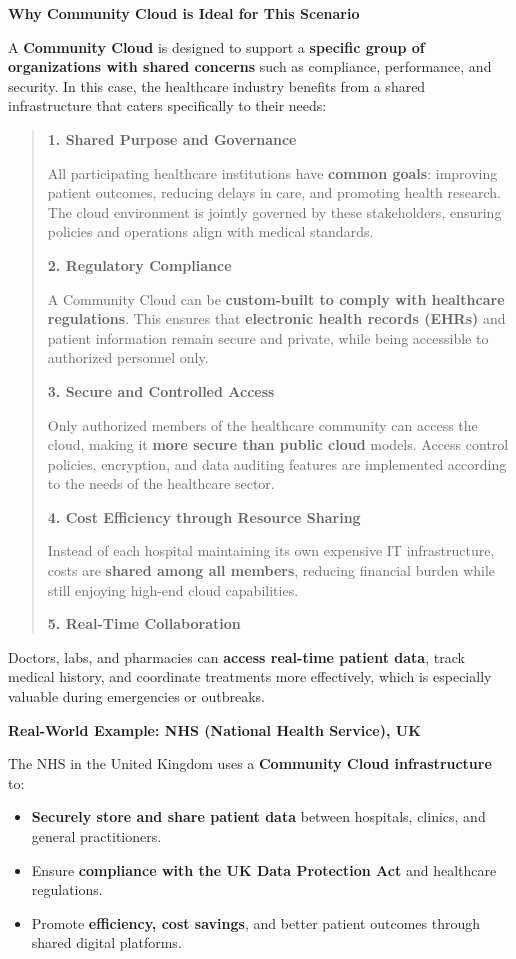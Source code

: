 \documentclass[12pt]{article}
\begin{document}
\textbf{Why Community Cloud is Ideal for This Scenario}

A \textbf{Community Cloud} is designed to support a \textbf{specific
group of organizations with shared concerns} such as compliance,
performance, and security. In this case, the healthcare industry
benefits from a shared infrastructure that caters specifically to their
needs:

\begin{quote}
\textbf{1. Shared Purpose and Governance}

All participating healthcare institutions have \textbf{common goals}:
improving patient outcomes, reducing delays in care, and promoting
health research. The cloud environment is jointly governed by these
stakeholders, ensuring policies and operations align with medical
standards.

\textbf{2. Regulatory Compliance}

A Community Cloud can be \textbf{custom-built to comply with healthcare
regulations}. This ensures that \textbf{electronic health records
(EHRs)} and patient information remain secure and private, while being
accessible to authorized personnel only.

\textbf{3. Secure and Controlled Access}

Only authorized members of the healthcare community can access the
cloud, making it \textbf{more secure than public cloud} models. Access
control policies, encryption, and data auditing features are implemented
according to the needs of the healthcare sector.

\textbf{4. Cost Efficiency through Resource Sharing}

Instead of each hospital maintaining its own expensive IT
infrastructure, costs are \textbf{shared among all members}, reducing
financial burden while still enjoying high-end cloud capabilities.

\textbf{5. Real-Time Collaboration}
\end{quote}

Doctors, labs, and pharmacies can \textbf{access real-time patient
data}, track medical history, and coordinate treatments more
effectively, which is especially valuable during emergencies or
outbreaks.

\textbf{Real-World Example: NHS (National Health Service), UK}

The NHS in the United Kingdom uses a \textbf{Community Cloud
infrastructure} to:

\begin{itemize}
\item
  \textbf{Securely store and share patient data} between hospitals,
  clinics, and general practitioners.
\item
  Ensure \textbf{compliance with the UK Data Protection Act} and
  healthcare regulations.
\item
  Promote \textbf{efficiency, cost savings}, and better patient outcomes
  through shared digital platforms.
\end{itemize}
\end{document}
